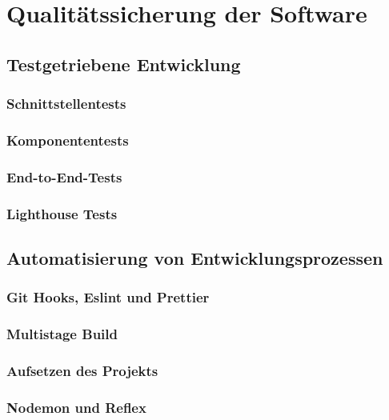 \chapter{Qualitätssicherung der Software}

\section{Testgetriebene Entwicklung}

\subsection{Schnittstellentests}

\subsection{Komponententests}

\subsection{End-to-End-Tests}

\subsection{Lighthouse Tests}

\section{Automatisierung von Entwicklungsprozessen}
\subsection{Git Hooks, Eslint und Prettier}
\subsection{Multistage Build}
\subsection{Aufsetzen des Projekts}
\subsection{Nodemon und Reflex}

